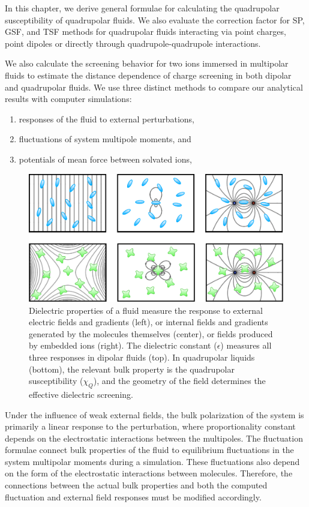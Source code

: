 In this chapter, we derive general formulae for calculating the
quadrupolar susceptibility of quadrupolar fluids. We also evaluate the
correction factor for SP, GSF, and TSF methods for quadrupolar fluids
interacting via point charges, point dipoles or directly through
quadrupole-quadrupole interactions.

We also calculate the screening behavior for two ions immersed in
multipolar fluids to estimate the distance dependence of charge
screening in both dipolar and quadrupolar fluids.  We use three
distinct methods to compare our analytical results with computer
simulations:
\begin{enumerate}
\item responses of the fluid to external perturbations,
\item fluctuations of system multipole moments, and
\item potentials of mean force between solvated ions,
\end{enumerate}

\begin{figure}
\includegraphics[width=\linewidth]{Schematic}
\caption{Dielectric properties of a fluid measure the response to
  external electric fields and gradients (left), or internal fields
  and gradients generated by the molecules themselves (center), or
  fields produced by embedded ions (right). The dielectric constant
  ($\epsilon$) measures all three responses in dipolar fluids (top).
  In quadrupolar liquids (bottom), the relevant bulk property is the
  quadrupolar susceptibility ($\chi_Q$), and the geometry of the field
  determines the effective dielectric screening.}
\label{fig:schematic}
\end{figure}

Under the influence of weak external fields, the bulk polarization of
the system is primarily a linear response to the perturbation, where
proportionality constant depends on the electrostatic interactions
between the multipoles. The fluctuation formulae connect bulk
properties of the fluid to equilibrium fluctuations in the system
multipolar moments during a simulation. These fluctuations also depend
on the form of the electrostatic interactions between molecules.
Therefore, the connections between the actual bulk properties and both
the computed fluctuation and external field responses must be modified
accordingly.

